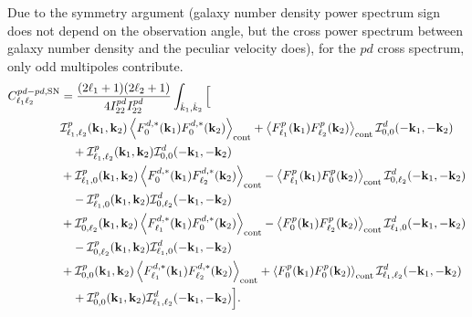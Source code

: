 \documentclass[a4paper,11pt]{article}
\begin{document}
Due to the symmetry argument (galaxy number density power spectrum sign does not depend on the observation angle, but the cross power spectrum between galaxy number density and the peculiar velocity does), for the \(pd\) cross spectrum, only odd multipoles contribute.
\begin{align}
C^{pd-pd,{\rm SN}}_{\ell_1\ell_2}
&=
\frac{(2\ell_1+1)(2\ell_2+1)}
{4I^{pd}_{22}I^{pd}_{22}}
\int_{\hat k_1,\hat k_2}
\Big[
\nonumber\\
&\mathcal I^p_{\ell_1,\ell_2}(\mathbf k_1,\mathbf k_2)
\left\langle
F^{d,*}_{0}(\mathbf k_1)F^{d,*}_{0}(\mathbf k_2)
\right\rangle_{\rm cont}
+
\left\langle
F^p_{\ell_1}(\mathbf k_1)F^p_{\ell_2}(\mathbf k_2)
\right\rangle_{\rm cont}
\mathcal I^d_{0,0}(-\mathbf k_1,-\mathbf k_2)
\nonumber\\
&\quad+
\mathcal I^p_{\ell_1,\ell_2}(\mathbf k_1,\mathbf k_2)
\mathcal I^d_{0,0}(-\mathbf k_1,-\mathbf k_2)
\nonumber\\
&+
\mathcal I^p_{\ell_1,0}(\mathbf k_1,\mathbf k_2)
\left\langle
F^{d,*}_{0}(\mathbf k_1)F^{d,*}_{\ell_2}(\mathbf k_2)
\right\rangle_{\rm cont}
-
\left\langle
F^p_{\ell_1}(\mathbf k_1)F^p_{0}(\mathbf k_2)
\right\rangle_{\rm cont}
\mathcal I^d_{0,\ell_2}(-\mathbf k_1,-\mathbf k_2)
\nonumber\\
&\quad-
\mathcal I^p_{\ell_1,0}(\mathbf k_1,\mathbf k_2)
\mathcal I^d_{0,\ell_2}(-\mathbf k_1,-\mathbf k_2)
\nonumber\\
&+
\mathcal I^p_{0,\ell_2}(\mathbf k_1,\mathbf k_2)
\left\langle
F^{d,*}_{\ell_1}(\mathbf k_1)F^{d,*}_{0}(\mathbf k_2)
\right\rangle_{\rm cont}
-
\left\langle
F^p_{0}(\mathbf k_1)F^p_{\ell_2}(\mathbf k_2)
\right\rangle_{\rm cont}
\mathcal I^d_{\ell_1,0}(-\mathbf k_1,-\mathbf k_2)
\nonumber\\
&\quad-
\mathcal I^p_{0,\ell_2}(\mathbf k_1,\mathbf k_2)
\mathcal I^d_{\ell_1,0}(-\mathbf k_1,-\mathbf k_2)
\nonumber\\
&+
\mathcal I^p_{0,0}(\mathbf k_1,\mathbf k_2)
\left\langle
F^{d,*}_{\ell_1}(\mathbf k_1)F^{d,*}_{\ell_2}(\mathbf k_2)
\right\rangle_{\rm cont}
+
\left\langle
F^p_{0}(\mathbf k_1)F^p_{0}(\mathbf k_2)
\right\rangle_{\rm cont}
\mathcal I^d_{\ell_1,\ell_2}(-\mathbf k_1,-\mathbf k_2)
\nonumber\\
&\quad+
\mathcal I^p_{0,0}(\mathbf k_1,\mathbf k_2)
\mathcal I^d_{\ell_1,\ell_2}(-\mathbf k_1,-\mathbf k_2)
\Big].
\end{align}
\end{document}
